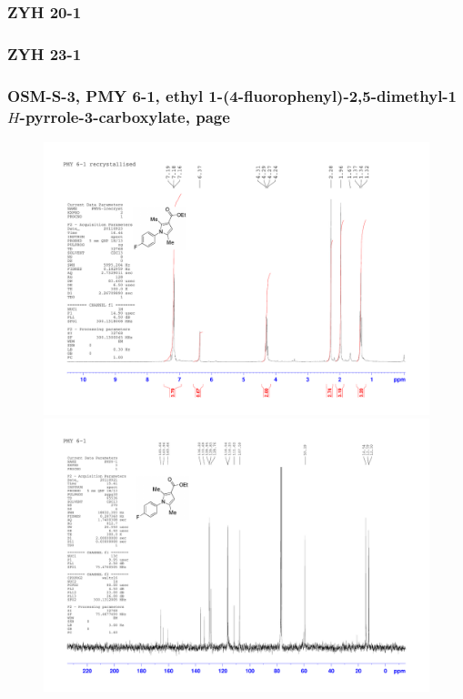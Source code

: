 \documentclass[12pt, a4paper,titlepage]{article}
\begin{document}
{\subsubsection*{ZYH 20-1}

\subsubsection*{ZYH 23-1}

\subsubsection*{OSM-S-3, PMY 6-1, ethyl 1-(4-fluorophenyl)-2,5-dimethyl-1$H$-pyrrole-3-carboxylate, page \pageref{exp:PMY6}}
\label{spec:PMY6}
	\begin{figure}[H] 
	\begin{center}
	\includegraphics[width=14.5cm]{expdata/PMY6/1H}
	\includegraphics[width=14.5cm]{expdata/PMY6/13C}
	\end{center}
	\end{figure}

}
\end{document}
